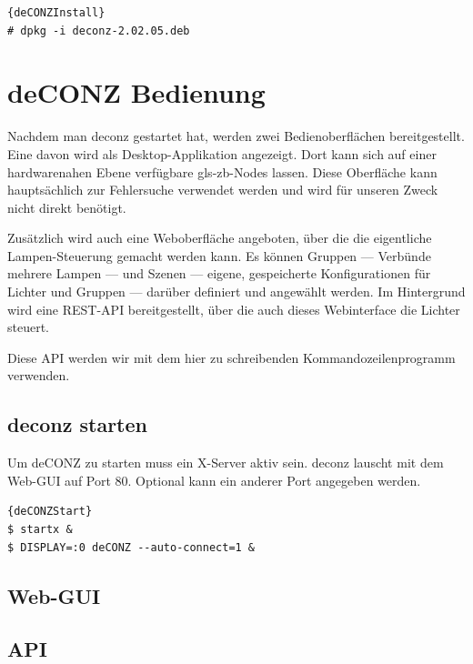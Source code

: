 \documentclass[a4paper,12pt]{article}
\begin{document}
\begin{lstlisting}[caption=deCONZ installieren]{deCONZInstall}
# dpkg -i deconz-2.02.05.deb
\end{lstlisting}

\newpage

\section{deCONZ Bedienung}
\label{deconz}

Nachdem man \acrshort{deconz} gestartet hat, werden zwei Bedienoberflächen bereitgestellt.
Eine davon wird als Desktop-Applikation angezeigt. Dort kann sich auf einer hardwarenahen
Ebene verfügbare \gls{gls-zb}-Nodes lassen. Diese Oberfläche kann hauptsächlich zur
Fehlersuche verwendet werden und wird für unseren Zweck nicht direkt benötigt.

Zusätzlich wird auch eine Weboberfläche angeboten, über die die eigentliche Lampen-Steuerung
gemacht werden kann. Es können Gruppen --- Verbünde mehrere Lampen --- und Szenen
--- eigene, gespeicherte Konfigurationen für Lichter und Gruppen --- darüber definiert und
angewählt werden. Im Hintergrund wird eine REST-API bereitgestellt, über die auch dieses
Webinterface die Lichter steuert.

\noindent
Diese API werden wir mit dem hier zu schreibenden Kommandozeilenprogramm verwenden.

\subsection{\acrshort{deconz} starten}

Um deCONZ zu starten muss ein X-Server aktiv sein. \acrshort{deconz} lauscht mit dem
Web-GUI auf Port 80. Optional kann ein anderer Port angegeben werden.

\begin{lstlisting}[caption=deCONZ starten]{deCONZStart}
$ startx &
$ DISPLAY=:0 deCONZ --auto-connect=1 &
\end{lstlisting}

\subsection{Web-GUI}
\subsection{API}

\newpage
\end{document}
